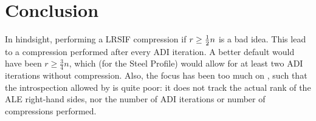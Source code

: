 \chapter{Conclusion}
\label{sec:conclusion}

In hindsight, performing a \ac{LRSIF} compression if $r \geq \tfrac{1}{2} n$ is a bad idea.
This lead to a compression performed after every \ac{ADI} iteration.
A better default would have been \eg $r \geq \frac{3}{4} n$,
which (for the Steel Profile) would allow for at least two \ac{ADI} iterations without compression.
Also, the focus has been too much on ,
such that the introspection allowed by  is quite poor:
it does not track the actual rank of the \ac{ALE} right-hand sides,
nor the number of \ac{ADI} iterations or number of compressions performed.

